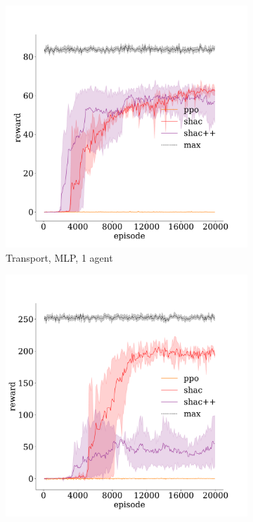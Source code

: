 \begin{figure}[t]
    \begin{subfigure}[b]{0.32\textwidth}
        \includegraphics[width=\textwidth]{figs/transport-1-mlp.pdf}
        \caption{Transport, MLP, 1 agent}
        \label{apx:fig:transport-mlp-1}
    \end{subfigure}
    \begin{subfigure}[b]{0.32\textwidth}
        \includegraphics[width=\textwidth]{figs/transport-3-mlp.pdf}

\end{subfigure}
\end{figure}
